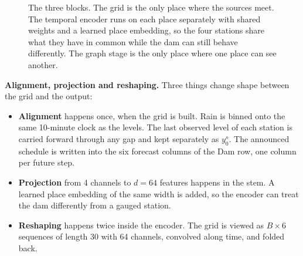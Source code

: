 \documentclass[11pt,letterpaper]{article}
\begin{document}
\begin{figure}[htbp]
{}
\caption{The three blocks. The grid is the only place where the sources meet. The
temporal encoder runs on each place separately with shared weights and a learned place
embedding, so the four stations share what they have in common while the dam can still
behave differently. The graph stage is the only place where one place can see another.}
\label{fig:blocks}
\end{figure}

\textbf{Alignment, projection and reshaping.} Three things change shape between
the grid and the output:

\begin{itemize}
\item \textbf{Alignment} happens once, when the grid is built. Rain is binned onto
the same 10-minute clock as the levels. The last observed level of each station is
carried forward through any gap and kept separately as $y^s_0$. The announced
schedule is written into the six forecast columns of the Dam row, one column per
future step.
\item \textbf{Projection} from 4 channels to $d{=}64$ features happens in the
stem. A learned place embedding of the same width is added, so the encoder can
treat the dam differently from a gauged station.
\item \textbf{Reshaping} happens twice inside the encoder. The grid is viewed as
$B\times6$ sequences of length 30 with 64 channels, convolved along time, and
folded back.
\end{itemize}
\end{document}
